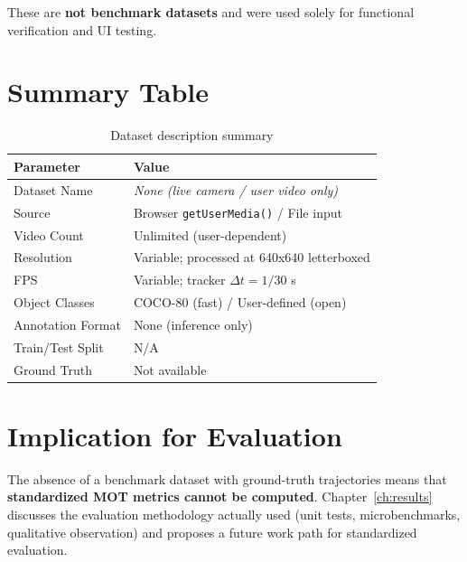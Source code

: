 These are \textbf{not benchmark datasets} and were used solely for functional verification and UI testing.

\section{Summary Table}
\label{sec:dataset-summary}

\begin{table}[htbp]
\centering
\caption{Dataset description summary}
\label{tab:dataset-summary}
\begin{tabular}{@{}ll@{}}
\toprule
\textbf{Parameter} & \textbf{Value} \\
\midrule
Dataset Name & \textit{None (live camera / user video only)} \\
Source & Browser \texttt{getUserMedia()} / File input \\
Video Count & Unlimited (user-dependent) \\
Resolution & Variable; processed at 640x640 letterboxed \\
FPS & Variable; tracker $\Delta t = 1/30$ s \\
Object Classes & COCO-80 (fast) / User-defined (open) \\
Annotation Format & None (inference only) \\
Train/Test Split & N/A \\
Ground Truth & Not available \\
\bottomrule
\end{tabular}
\end{table}

\section{Implication for Evaluation}
\label{sec:eval-implication}

The absence of a benchmark dataset with ground-truth trajectories means that \textbf{standardized MOT metrics cannot be computed}. Chapter~\ref{ch:results} discusses the evaluation methodology actually used (unit tests, microbenchmarks, qualitative observation) and proposes a future work path for standardized evaluation.
